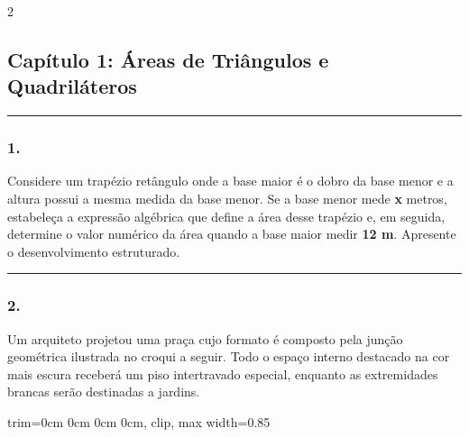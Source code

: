 \documentclass[twoside, 10pt, a4paper]{article}
\newlength{\espacoPosTitulo}\setlength{\espacoPosTitulo}{0.3cm}
\newlength{\espacoPreQuestao}\setlength{\espacoPreQuestao}{0.1cm}
\newlength{\espacoQuestao}\setlength{\espacoQuestao}{0.2cm}
\newcommand{\larguraTikz}{0.85\linewidth}
\begin{document}
\par\vspace{0.3cm} 
\raggedcolumns
\begin{multicols*}{2}
\vspace{0.1cm}

\subsection*{Capítulo 1: Áreas de Triângulos e Quadriláteros}
\vspace{-0.2cm}\noindent\rule{\linewidth}{1.5pt} 
\par\vspace{\espacoPosTitulo}
\subsubsection*{1.} Considere um trapézio retângulo onde a base maior é o dobro da base menor e a altura possui a mesma medida da base menor. Se a base menor mede \textbf{x} metros, estabeleça a expressão algébrica que define a área desse trapézio e, em seguida, determine o valor numérico da área quando a base maior medir \textbf{12 m}. Apresente o desenvolvimento estruturado.
\par\vspace{\espacoQuestao}

\noindent\textcolor{CorLinha}{\rule{\linewidth}{0.5pt}} 
\par\vspace{\espacoPreQuestao}
\subsubsection*{2.} Um arquiteto projetou uma praça cujo formato é composto pela junção geométrica ilustrada no croqui a seguir. Todo o espaço interno destacado na cor mais escura receberá um piso intertravado especial, enquanto as extremidades brancas serão destinadas a jardins.
\begin{center}
\begin{adjustbox}{trim=0cm 0cm 0cm 0cm, clip, max width=\larguraTikz}
\end{adjustbox}
\end{center}
\end{multicols*}
\end{document}
